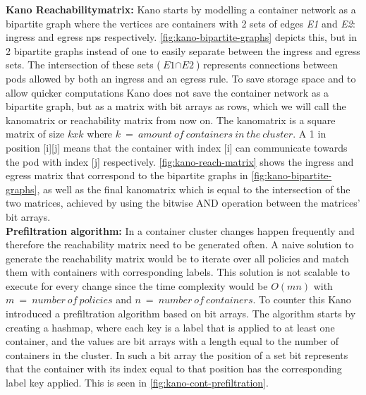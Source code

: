 \textbf{Kano Reachabilitymatrix:} \label{kano:matrix} Kano starts by modelling a container network as a bipartite graph where the vertices are containers with 2 sets of edges \textit{E1} and \textit{E2}: ingress and egress \acrshort{np}s respectively. \autoref{fig:kano-bipartite-graphs} depicts this, but in 2 bipartite graphs instead of one to easily separate between the ingress and egress sets. The intersection of these sets  ($\textit{E1} \cap \textit{E2}$) represents connections between pods allowed by both an ingress and an egress rule. To save storage space and to allow quicker computations Kano does not save the container network as a bipartite graph, but as a matrix with bit arrays as rows, which we will call the kanomatrix or reachability matrix from now on. The kanomatrix is a square matrix of size \(kxk\) where \(k\ =\ amount\  of\  containers\  in\  the\  cluster\). A 1 in position [i][j] means that the container with index [i] can communicate towards the pod with index [j] respectively. \autoref{fig:kano-reach-matrix} shows the ingress and egress matrix that correspond to the bipartite graphs in \autoref{fig:kano-bipartite-graphs}, as well as the final kanomatrix which is equal to the intersection of the two matrices, achieved by using the bitwise AND operation between the matrices' bit arrays.
\\[10pt]

\textbf{Prefiltration algorithm:} \label{kano:prefiltration} In a container cluster changes happen frequently and therefore the reachability matrix need to be generated often. A naive solution to generate the reachability matrix would be to iterate over all policies and match them with containers with corresponding labels. This solution is not scalable to execute for every change since the time complexity would be $O(mn)$ with $m\ =\ number\ of\ policies$ and $n\ =\ number\ of\ containers$. To counter this Kano introduced a prefiltration algorithm based on bit arrays. The algorithm starts by creating a hashmap, where each key is a label that is applied to at least one container, and the values are bit arrays with a length equal to the number of containers in the cluster. In such a bit array the position of a set bit represents that the container with its index equal to that position has the corresponding label key applied. This is seen in \autoref{fig:kano-cont-prefiltration}.
\\[10pt] 

